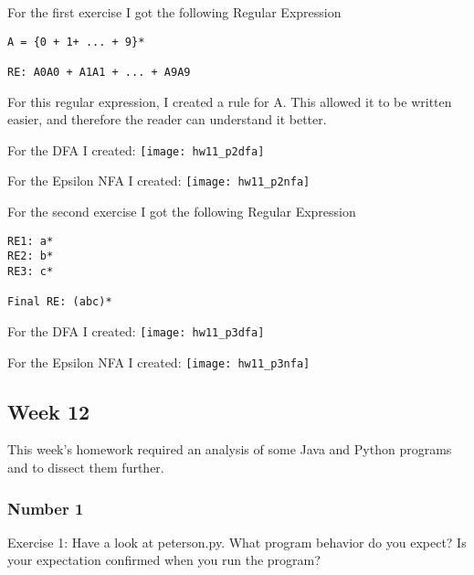 \documentclass{article}
\theoremstyle{theorem}
\theoremstyle{definition}
\theoremstyle{remark}
\begin{document}
\noindent\newline\newline For the first exercise I got the following Regular Expression
\begin{verbatim}
A = {0 + 1+ ... + 9}*

RE: A0A0 + A1A1 + ... + A9A9
\end{verbatim}

\noindent\newline For this regular expression, I created a rule for A. This allowed it to be written easier, and therefore the reader can understand it better.

\noindent\newline\newline For the DFA I created:\newline
\texttt{[image: hw11\_p2dfa]}

\noindent\newline\newline For the Epsilon NFA I created:\newline
\texttt{[image: hw11\_p2nfa]}

\noindent\newline\newline For the second exercise I got the following Regular Expression
\begin{verbatim}
RE1: a*
RE2: b*
RE3: c*

Final RE: (abc)*
\end{verbatim}

\noindent\newline\newline For the DFA I created:\newline
\texttt{[image: hw11\_p3dfa]}

\noindent\newline\newline For the Epsilon NFA I created:\newline
\texttt{[image: hw11\_p3nfa]}


\subsection{Week 12}
\noindent\newline This week's homework required an analysis of some Java and Python programs and to dissect them further.

\subsubsection{Number 1}
\noindent\newline Exercise 1: Have a look at peterson.py. What program behavior do you expect? Is your expectation confirmed when you run the program? 
\end{document}
